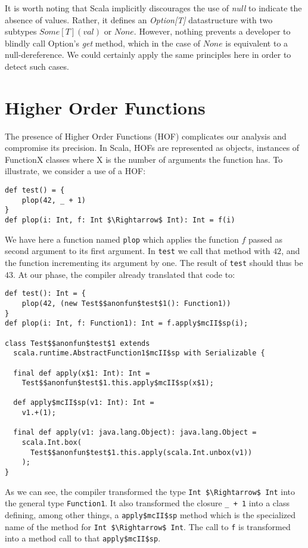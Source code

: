 It is worth noting that Scala implicitly discourages the use of \emph{null} to
indicate the absence of values. Rather, it defines an \emph{Option[T]}
datastructure with two subtypes $Some[T](val)$ or $None$. However,
nothing prevents a developer to blindly call Option's \emph{get} method, which
in the case of $None$ is equivalent to a null-dereference. We could certainly
apply the same principles here in order to detect such cases.

\section{Higher Order Functions}
The presence of Higher Order Functions (HOF) complicates our analysis and
compromise its precision. In Scala, HOFs are represented as objects, instances
of FunctionX classes where X is the number of arguments the function has. To
illustrate, we consider a use of a HOF:
\begin{lstlisting}
def test() = {
    plop(42, _ + 1)
}
def plop(i: Int, f: Int $\Rightarrow$ Int): Int = f(i)
\end{lstlisting}
We have here a function named \lstinline{plop} which applies the function $f$ passed
as second argument to its first argument. In \lstinline{test} we call that method
with $42$, and the function incrementing its argument by one. The result of
\lstinline{test} should thus be $43$. At our phase, the compiler already
translated that code to:
\begin{lstlisting}
def test(): Int = {
    plop(42, (new Test$$anonfun$test$1(): Function1))
}
def plop(i: Int, f: Function1): Int = f.apply$mcII$sp(i);

class Test$$anonfun$test$1 extends
  scala.runtime.AbstractFunction1$mcII$sp with Serializable {

  final def apply(x$1: Int): Int =
    Test$$anonfun$test$1.this.apply$mcII$sp(x$1);

  def apply$mcII$sp(v1: Int): Int =
    v1.+(1);

  final def apply(v1: java.lang.Object): java.lang.Object =
    scala.Int.box(
      Test$$anonfun$test$1.this.apply(scala.Int.unbox(v1))
    );
}

\end{lstlisting}
As we can see, the compiler transformed the type \lstinline{Int $\Rightarrow$ Int} into
the general type \lstinline{Function1}. It also transformed the closure
\lstinline{_ + 1} into a class defining, among other things, a
\lstinline{apply$mcII$sp} method which is the specialized name of the method
for \lstinline{Int $\Rightarrow$ Int}. The call to \lstinline{f} is transformed into a
method call to that \lstinline{apply$mcII$sp}.

